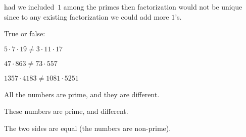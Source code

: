 \documentclass{test}  %
\begin{document}
\begin{problem}

\end{problem}

\noindent\remark had we included~$1$ among the primes then 
factorization would not be unique 
since to any existing factorization we could add more $1$'s.

\begin{problem} True or false:
\begin{items}
\item $5\cdot 7\cdot 19\neq 3\cdot 11\cdot 17$
\item $47\cdot 863\neq 73\cdot 557$
\item $1357\cdot 4183\neq 1081\cdot 5251$ %
\end{items}
\begin{answer}
\begin{items}
\item All the numbers are prime, and they are different.
\item These numbers are prime, and different.
\item The two sides are equal (the numbers are non-prime).     
\end{items}
\end{answer}
\end{problem}

\end{document}

